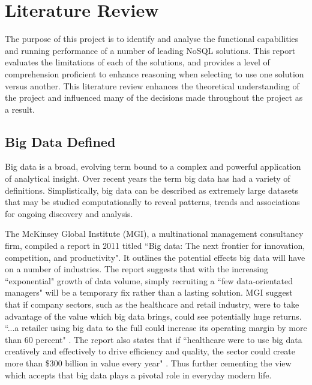 \chapter{Literature Review}
The purpose of this project is to identify and analyse the functional capabilities and running performance of a number of leading NoSQL solutions. This report evaluates the limitations of each of the solutions, and provides a level of comprehension proficient to enhance reasoning when selecting to use one solution versus another. This literature review enhances the theoretical understanding of the project and influenced many of the decisions made throughout the project as a result.

\section{Big Data Defined}\label{bigdata}
Big data is a broad, evolving term bound to a complex and powerful application of analytical insight. Over recent years the term big data has had a variety of definitions. Simplistically, big data can be described as extremely large datasets that may be studied computationally to reveal patterns, trends and associations for ongoing discovery and analysis.

The McKinsey Global Institute (MGI), a multinational management consultancy firm, compiled a report in 2011 titled ``Big data: The next frontier for innovation, competition, and productivity". It outlines the potential effects big data will have on a number of industries. The report suggests that with the increasing ``exponential" growth of data volume, simply recruiting a ``few data-orientated managers" will be a temporary fix rather than a lasting solution. MGI suggest that if company sectors, such as the healthcare and retail industry, were to take advantage of the value which big data brings, could see potentially huge returns. ``...a retailer using big data to the full could increase its operating margin by more than 60 percent" \cite{mckinskey}. The report also states that if ``healthcare were to use big data creatively and effectively to drive efficiency and quality, the sector could create more than \$300 billion in value every year" \cite{mckinskey}. Thus further cementing the view which accepts that big data plays a pivotal role in everyday modern life.


